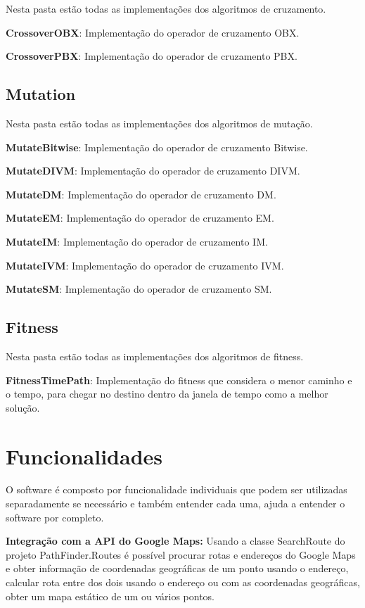 Nesta pasta estão todas as implementações dos algoritmos de cruzamento.

\textbf{CrossoverOBX}: Implementação do operador de cruzamento OBX.

\textbf{CrossoverPBX}: Implementação do operador de cruzamento PBX.

\subsection{Mutation}

Nesta pasta estão todas as implementações dos algoritmos de mutação.

\textbf{MutateBitwise}: Implementação do operador de cruzamento Bitwise.

\textbf{MutateDIVM}: Implementação do operador de cruzamento DIVM.

\textbf{MutateDM}: Implementação do operador de cruzamento DM.

\textbf{MutateEM}: Implementação do operador de cruzamento EM.

\textbf{MutateIM}: Implementação do operador de cruzamento IM.

\textbf{MutateIVM}: Implementação do operador de cruzamento IVM.

\textbf{MutateSM}: Implementação do operador de cruzamento SM.

\subsection{Fitness}

Nesta pasta estão todas as implementações dos algoritmos de fitness.

\textbf{FitnessTimePath}: Implementação do fitness que considera o menor caminho e o tempo, para chegar no destino dentro da janela de tempo como a melhor solução.

\section{Funcionalidades}
O software é composto por funcionalidade individuais que podem ser utilizadas separadamente se necessário e também entender cada uma, ajuda a entender o software por completo.

\textbf{Integração com a API do Google Maps:} Usando a classe SearchRoute do projeto PathFinder.Routes é possível procurar rotas e endereços do Google Maps e obter informação de coordenadas geográficas de um ponto usando o endereço, calcular rota entre dos dois usando o endereço ou com as coordenadas geográficas, obter um mapa estático de um ou vários pontos.

